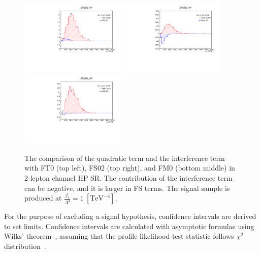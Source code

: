 \begin{figure}[ht]
    \centering
        \includegraphics[width=0.45\textwidth]{figures/aQGC/FT0_0ptag1pfat0pjet_0ptv_SRVBS_HP_MllJ.pdf}
    	\includegraphics[width=0.45\textwidth]{figures/aQGC/FS02_0ptag1pfat0pjet_0ptv_SRVBS_HP_MllJ.pdf}
        \includegraphics[width=0.45\textwidth]{figures/aQGC/FM0_0ptag1pfat0pjet_0ptv_SRVBS_HP_MllJ.pdf}
        \caption{The comparison of the quadratic term and the interference term with FT0 (top left), FS02 (top right), and FM0 (bottom middle) in 2-lepton channel HP SR. The contribution of the interference term can be negative, and it is larger in FS terms. The signal sample is produced at $\frac{f_i}{\Lambda^4} = 1~[\mathrm{TeV}^{-4}]$. }
        \label{fig:quadint}
\end{figure}
For the purpose of excluding a signal hypothesis, confidence intervals are derived to set limits. 
Confidence intervals are calculated with asymptotic formulae using Wilks' theorem~\cite{10.1214/aoms/1177732360}, assuming that the profile likelihood test statistic follows $\chi^2$ distribution~\cite{Cowan:2010js}.

